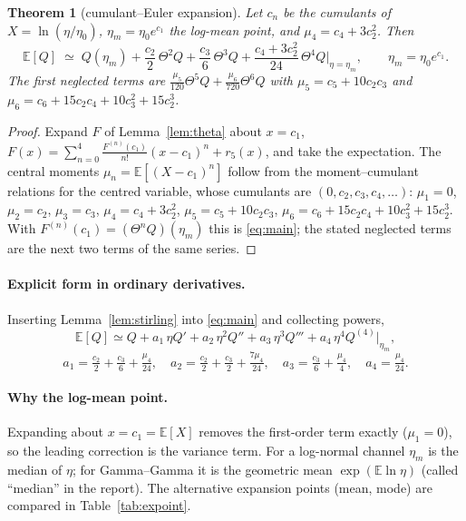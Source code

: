 \documentclass[11pt,a4paper]{article}
\theoremstyle{plain}
\newtheorem{theorem}{Theorem}
\theoremstyle{remark}
\begin{document}
\begin{theorem}[cumulant--Euler expansion]\label{thm:main}
Let $c_n$ be the cumulants of $X=\ln(\eta/\eta_0)$, $\eta_m=\eta_0e^{c_1}$ the log-mean point, and $\mu_4=c_4+3c_2^2$. Then
\begin{equation}
  \boxed{\;
  \mathbb E[Q]\;\simeq\;Q(\eta_m)+\frac{c_2}{2}\,\Theta^2Q+\frac{c_3}{6}\,\Theta^3Q+\frac{c_4+3c_2^{2}}{24}\,\Theta^4Q\Big|_{\eta=\eta_m},\qquad \eta_m=\eta_0e^{c_1}.\;}
  \label{eq:main}
\end{equation}
The first neglected terms are $\frac{\mu_5}{120}\Theta^5Q+\frac{\mu_6}{720}\Theta^6Q$ with $\mu_5=c_5+10c_2c_3$ and $\mu_6=c_6+15c_2c_4+10c_3^2+15c_2^3$.
\end{theorem}
\begin{proof}
Expand $F$ of Lemma~\ref{lem:theta} about $x=c_1$,
$F(x)=\sum_{n=0}^{4}\frac{F^{(n)}(c_1)}{n!}(x-c_1)^n+r_5(x)$, and take the expectation. The central moments $\mu_n=\mathbb E[(X-c_1)^n]$ follow from the moment--cumulant relations for the centred variable, whose cumulants are $(0,c_2,c_3,c_4,\dots)$: $\mu_1=0$, $\mu_2=c_2$, $\mu_3=c_3$, $\mu_4=c_4+3c_2^2$, $\mu_5=c_5+10c_2c_3$, $\mu_6=c_6+15c_2c_4+10c_3^2+15c_2^3$. With $F^{(n)}(c_1)=(\Theta^nQ)(\eta_m)$ this is \eqref{eq:main}; the stated neglected terms are the next two terms of the same series.
\end{proof}

\paragraph{Explicit form in ordinary derivatives.}
Inserting Lemma~\ref{lem:stirling} into \eqref{eq:main} and collecting powers,
\begin{equation}
  \mathbb E[Q]\simeq Q+a_1\,\eta Q'+a_2\,\eta^2Q''+a_3\,\eta^3Q'''+a_4\,\eta^4Q^{(4)}\Big|_{\eta_m},
\end{equation}
\begin{equation}
  a_1=\tfrac{c_2}{2}+\tfrac{c_3}{6}+\tfrac{\mu_4}{24},\quad
  a_2=\tfrac{c_2}{2}+\tfrac{c_3}{2}+\tfrac{7\mu_4}{24},\quad
  a_3=\tfrac{c_3}{6}+\tfrac{\mu_4}{4},\quad
  a_4=\tfrac{\mu_4}{24}.
\end{equation}

\paragraph{Why the log-mean point.}
Expanding about $x=c_1=\mathbb E[X]$ removes the first-order term exactly ($\mu_1=0$), so the leading correction is the variance term. For a log-normal channel $\eta_m$ is the median of $\eta$; for Gamma--Gamma it is the geometric mean $\exp(\mathbb E\ln\eta)$ (called ``median'' in the report). The alternative expansion points (mean, mode) are compared in Table~\ref{tab:expoint}.
\end{document}
